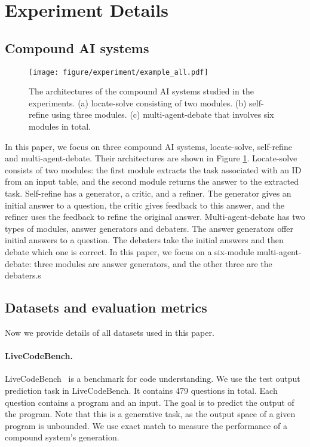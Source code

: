 \section{Experiment Details}
\subsection{Compound AI systems}
\begin{figure}[!ht]
    \centering
    \texttt{[image: figure/experiment/example\_all.pdf]}
    \caption{The architectures of the compound AI systems studied in the experiments. (a) locate-solve consisting of two modules. (b) self-refine using three modules. (c) multi-agent-debate that involves six modules in total.}
    \label{fig:deluxeagent:systemdemo}
\end{figure}

In this paper, we focus on three compound AI systems, locate-solve, self-refine and multi-agent-debate. Their architectures are shown in Figure \ref{fig:deluxeagent:systemdemo}. Locate-solve consists of two modules: the first module extracts the task associated with an ID from an input table, and the second module returns the answer to the extracted task. Self-refine has a generator, a critic, and a refiner. The generator gives an initial answer to a question, the critic gives feedback to this answer, and the refiner uses the feedback to refine the original answer. Multi-agent-debate has two types of modules, answer generators and  debaters. The answer generators offer initial answers to a question. The debaters take the initial answers and then debate which one is correct. 
In this paper, we focus on a six-module multi-agent-debate: three modules are answer generators, and the other three are the debaters.s


\subsection{Datasets and evaluation metrics}
Now we provide details of all datasets used in this paper.

\paragraph{LiveCodeBench.} LiveCodeBench~\cite{jain2024livecodebench} is a benchmark for code understanding.  We use the test output prediction task in LiveCodeBench. It contains 479 questions in total. Each question contains a program and an input. The goal is to predict the output of the program. Note that this is a generative task, as the output space of a given program is unbounded. We  use exact match to measure the performance of a compound system's generation.

